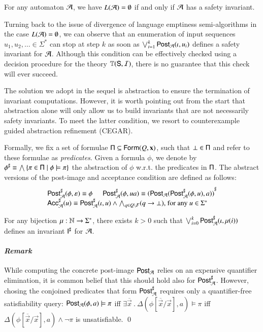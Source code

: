 \documentclass[10pt,conference,letterpaper,twocolumn]{IEEEtran}
\begin{document}
\begin{lemma}\label{lemma:safety-invariant}
  For any automaton $\mathcal{A}$, we have $L(\mathcal{A}) = \emptyset$ if and only if
  $\mathcal{A}$ has a safety invariant.
\end{lemma}

Turning back to the issue of divergence of language emptiness
semi-algorithms in the case $L(\mathcal{A}) = \emptyset$, we can observe that
an enumeration of input sequences $u_1,u_2,\ldots \in \Sigma^*$ can
stop at step $k$ as soon as $\bigvee_{i=1}^k \mathsf{Post}_{\mathcal{A}}(\iota,u_i)$
defines a safety invariant for $\mathcal{A}$. Although this condition can be
effectively checked using a decision procedure for the theory
$\mathbb{T}(\mathsf{S},\mathcal{I})$, there is no guarantee that this check will ever
succeed.

The solution we adopt in the sequel is abstraction to ensure the
termination of invariant computations. However, it is worth pointing
out from the start that abstraction alone will only allow us to build
invariants that are not necessarily safety invariants. To meet the
latter condition, we resort to counterexample guided abstraction
refinement (CEGAR).

Formally, we fix a set of formulae $\mathsf{\Pi} \subseteq
\mathsf{Form}(Q,\mathbf x)$, such that $\bot \in \mathsf{\Pi}$ and refer to these
formulae as \emph{predicates}. Given a formula $\phi$, we denote by
${\phi}^\sharp \equiv \bigwedge \left\{ \pi \in \mathsf{\Pi} \mid \phi \models
  \pi \right\}$ the abstraction of $\phi$ w.r.t. the predicates in
$\mathsf{\Pi}$. The abstract versions of the post-image and acceptance
condition are defined as follows:
\[\begin{array}{l}
{\mathsf{Post}}^\sharp_{\mathcal{A}}(\phi,\varepsilon) \equiv \phi \hspace*{5mm}
{\mathsf{Post}}^\sharp_{\mathcal{A}}(\phi,ua) \equiv {(\mathsf{Post}_{\mathcal{A}}({\mathsf{Post}}^\sharp_{\mathcal{A}}(\phi,u),a))}^\sharp \\
{\mathsf{Acc}}^\sharp_{\mathcal{A}}(u) \equiv {\mathsf{Post}}^\sharp_{\mathcal{A}}(\iota,u) \wedge \bigwedge_{q \in Q \setminus F} 
(q \rightarrow \bot)\text{, for any $u \in \Sigma^*$}
\end{array}\]

\begin{lemma}\label{lemma:abstract-invariant}
  For any bijection $\mu : {\bf \mathbb{N}} \rightarrow \Sigma^*$, there exists
  $k>0$ such that $\bigvee_{i=0}^k {\mathsf{Post}}^\sharp_{\mathcal{A}}(\iota,\mu(i))$ defines
  an invariant ${\mathsf{I}}^\sharp$ for $\mathcal{A}$. 
\end{lemma}

\paragraph{\em Remark}
While computing the concrete post-image $\mathsf{Post}_{\mathcal{A}}$ relies on an
expensive quantifier elimination, it is common belief that this should
hold also for ${\mathsf{Post}}^\sharp_{\mathcal{A}}$. However, chosing the conjoined
predicates that form ${\mathsf{Post}}^\sharp_{\mathcal{A}}$ requires only a quantifier-free
satisfiability query: $\mathsf{Post}_{\mathcal{A}}(\phi,a) \models \pi$ iff $\exists
\overline{\vec{x}} ~.~ \Delta(\phi[\overline{\vec{x}}/\vec{x}],a)
\models \pi$ iff $\Delta(\phi[\overline{\vec{x}}/\vec{x}],a) \wedge
\neg\pi$ is unsatisfiable. \qed
\end{document}
